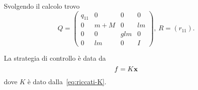 Svolgendo il calcolo trovo
\begin{equation*}
    Q = \left(
    \begin{array}{cccc}
        q_{11} & 0 & 0 & 0 \\
        0 & m+M & 0 & lm \\
        0 & 0 & glm & 0 \\
        0 & lm & 0 & I
    \end{array}
    \right), \
    R = \left(
    r_{11}
    \right).
\end{equation*}

La strategia di controllo è data da
\begin{equation*}
    f = K\mathbf{x}
\end{equation*}
dove $K$ è dato dalla~\eqref{eq:riccati-K}.